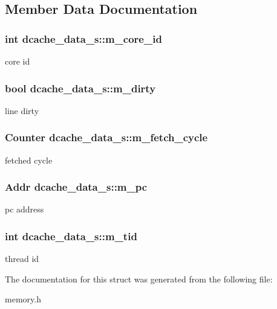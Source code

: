 \subsection{Member Data Documentation}
\hypertarget{structdcache__data__s_a6fec40ec8559ce4500900d904ff7f1be}{
\subsubsection[{m\_\-core\_\-id}]{\setlength{\rightskip}{0pt plus 5cm}int {\bf dcache\_\-data\_\-s::m\_\-core\_\-id}}}
\label{structdcache__data__s_a6fec40ec8559ce4500900d904ff7f1be}
core id \hypertarget{structdcache__data__s_a7cdb5d97e38e3d809bcd15606a1c88cc}{
\subsubsection[{m\_\-dirty}]{\setlength{\rightskip}{0pt plus 5cm}bool {\bf dcache\_\-data\_\-s::m\_\-dirty}}}
\label{structdcache__data__s_a7cdb5d97e38e3d809bcd15606a1c88cc}
line dirty \hypertarget{structdcache__data__s_a5314b8ca6633a626c5f4950b4c85098e}{
\subsubsection[{m\_\-fetch\_\-cycle}]{\setlength{\rightskip}{0pt plus 5cm}Counter {\bf dcache\_\-data\_\-s::m\_\-fetch\_\-cycle}}}
\label{structdcache__data__s_a5314b8ca6633a626c5f4950b4c85098e}
fetched cycle \hypertarget{structdcache__data__s_a5dfdd969951708a037337450e7ae9f36}{
\subsubsection[{m\_\-pc}]{\setlength{\rightskip}{0pt plus 5cm}Addr {\bf dcache\_\-data\_\-s::m\_\-pc}}}
\label{structdcache__data__s_a5dfdd969951708a037337450e7ae9f36}
pc address \hypertarget{structdcache__data__s_a678d12e44bf2d56cef863426858f62e4}{
\subsubsection[{m\_\-tid}]{\setlength{\rightskip}{0pt plus 5cm}int {\bf dcache\_\-data\_\-s::m\_\-tid}}}
\label{structdcache__data__s_a678d12e44bf2d56cef863426858f62e4}
thread id 

The documentation for this struct was generated from the following file:\begin{DoxyCompactItemize}
\item 
memory.h\end{DoxyCompactItemize}
